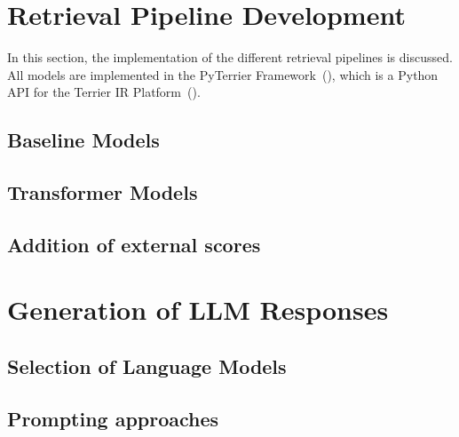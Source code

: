 \section{Retrieval Pipeline Development}
In this section, the implementation of the different retrieval pipelines is discussed.
All models are implemented in the PyTerrier Framework~(\cite{pyterrier:2020}), which is a Python API for the Terrier IR Platform~(\cite{macdonald:2012}).

\subsection{Baseline Models}


\subsection{Transformer Models}

\subsection{Addition of external scores}

\section{Generation of LLM Responses}


\subsection{Selection of Language Models}

\subsection{Prompting approaches}
